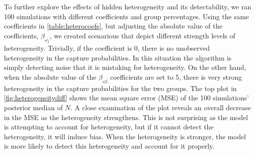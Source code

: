 \documentclass[
  12pt,
]{article}
\begin{document}
To further explore the effects of hidden heterogeneity and its
detectability, we ran 100 simulations with different coefficients and
group percentages. Using the same coefficients in
\autoref{table:heterocoefs}, but adjusting the absolute value of the
coefficients, \(\beta_{\omega_j}\), we created scenarious that depict
different strength levels of heterogeneity. Trivially, if the
coefficient is 0, there is no unobserved heterogeneity in the capture
probabilities. In this situation the algorithm is simply detecting noise
that it is mistaking for heterogeneity. On the other hand, when the
absolute value of the \(\beta_{\omega j}\) coefficients are set to 5,
there is very strong heterogeneity in the capture probabilities for the
two groups. The top plot in \autoref{fig:heterogeneitydiff} shows the
mean square error (MSE) of the 100 simulations' posterior median of
\(N\). A close examination of the plot reveals an overall decrease in
the MSE as the heterogeneity strengthens. This is not surprising as the
model is attempting to account for heterogeneity, but if it cannot
detect the heterogeneity, it will induce bias. When the heterogeneity is
stronger, the model is more likely to detect this heterogeneity and
account for it properly.
\end{document}
